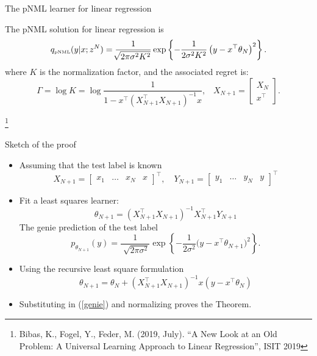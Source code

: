 \documentclass[aspectratio=169]{beamer}
\newcommand\blfootnote[1]{%
  \begingroup
  \renewcommand\thefootnote{}\footnote{#1}%
  \addtocounter{footnote}{-1}%
  \endgroup
}
\begin{document}
\begin{frame}{The pNML learner for linear regression}
    \begin{theorem}
    The pNML solution for linear regression is
    \begin{equation}
    q_{\mbox{\tiny{pNML}}}(y | x; z^N) = \frac{1}{\sqrt[]{2\pi\sigma^2 K^2}}\exp\left\{-\frac{1}{2\sigma^2 K^2}\left(y - x^\top \theta_N \right)^2\right\}.
    \end{equation}
    where $K$ is the normalization factor, and 
    the associated regret is:
    \begin{equation}
    \Gamma = \log K = \log \frac{1}{1 - x^\top (X_{N+1}^\top X_{N+1} )^{-1} x }, \;\;\;X_{N+1} = \begin{bmatrix} X_N \\ x^\top  \end{bmatrix}.  
    \end{equation}
    \end{theorem} 
    \blfootnote{Bibas, K., Fogel, Y., Feder, M. (2019, July). ``A New Look at an Old Problem: A Universal Learning Approach to Linear Regression'', ISIT 2019}
    
\end{frame}

\begin{frame}{Sketch of the proof}
\begin{itemize}
\item Assuming that the test label is known
    \begin{equation*}
    X_{N+1} = \begin{bmatrix} x_1 & \dots & x_N & x \end{bmatrix}^\top, \;\;\ \ 
    Y_{N+1} = \begin{bmatrix} y_1 & \dots & y_N & y \end{bmatrix}^\top 
    \end{equation*}
\item Fit a least squares learner: 
    \begin{equation*}
    \theta_{N+1} = (X_{N+1}^\top X_{N+1})^{-1} X_{N+1}^\top Y_{N+1}
    \end{equation*}
    The genie prediction of the test label
    \begin{equation} \label{genie}
    p_{\theta_{N+1}}(y) =
    \frac{1}{\sqrt[]{2\pi\sigma^2}}\exp\left\{-\frac{1}{2\sigma^2}\big(y- x^\top \theta_{N+1} \big)^2\right\}.
    \end{equation}
\item Using the recursive least square formulation
    \begin{equation}
    \theta_{N+1} = \theta_{N} + \left(X_{N+1}^\top X_{N+1}\right)^{-1} x (y -  x^\top \theta_N)
    \end{equation}
\item Substituting in (\ref{genie}) and normalizing proves the Theorem.
\end{itemize}
\end{frame}
\end{document}

